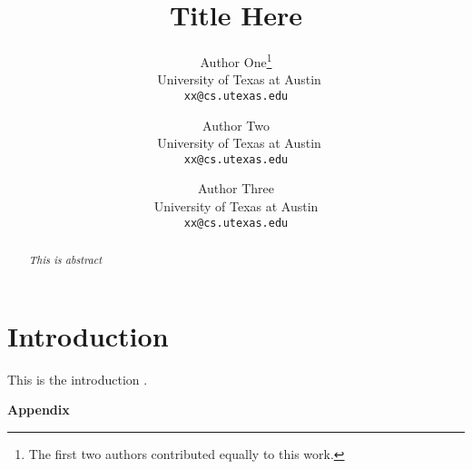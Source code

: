 \documentclass[11pt]{article}
\title{\huge Title Here}
\author{%
	Author One\thanks{The first two authors contributed equally to this work.}\\
    ~University of Texas at Austin\\
	\texttt{xx@cs.utexas.edu}
	\and
	Author Two\printfnsymbol{1}\\
	~University of Texas at Austin\\
	\texttt{xx@cs.utexas.edu} \\
	\and 
	Author Three\\
	University of Texas at Austin\\
	\texttt{xx@cs.utexas.edu} \\
}
\date{}
\begin{document}
\maketitle



\begin{abstract}
  \emph{This is abstract} 
\end{abstract}


\section{Introduction}

This is the introduction \citep{sutton98beinforcement}.




\clearpage

%


\clearpage

\onecolumn
\appendix
\begin{center}
\Large
\textbf{Appendix}
\end{center}



%
\end{document}
